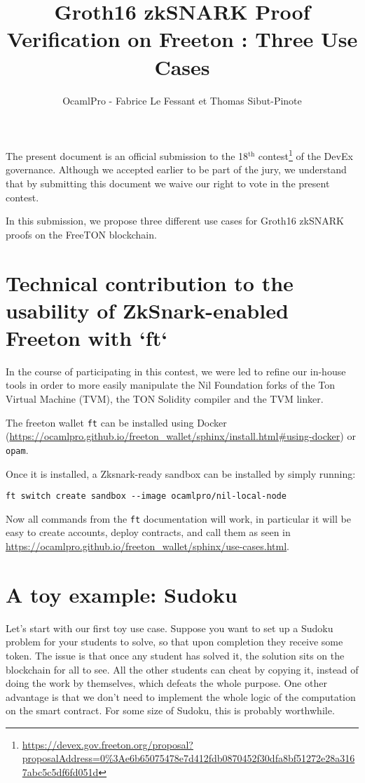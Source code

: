 \documentclass[10pt,a4paper]{article}
\author{OcamlPro - Fabrice Le Fessant et Thomas Sibut-Pinote}
\title{Groth16 zkSNARK Proof Verification on Freeton : Three Use Cases}
\begin{document}
\maketitle

The present document is an official submission to the 18$^{\text{th}}$ contest\footnote{\url{https://devex.gov.freeton.org/proposal?proposalAddress=0\%3Ae6b65075478e7d412fdb0870452f30dfa8bf51272e28a3167abc5c5df6fd051d}} of the DevEx governance. Although we accepted earlier to be part of the jury, we understand that by submitting this document we waive our right to vote in the present contest.

In this submission, we propose three different use cases for Groth16
zkSNARK proofs on the FreeTON blockchain.

\section{Technical contribution to the usability of ZkSnark-enabled Freeton with `ft`}

In the course of participating in this contest, we were led to refine our in-house tools in order to more easily manipulate the Nil Foundation forks of the Ton Virtual Machine (TVM), the TON Solidity compiler and the TVM linker.

The freeton wallet \lstinline|ft| can be installed using Docker (\url{https://ocamlpro.github.io/freeton_wallet/sphinx/install.html#using-docker}) or \lstinline|opam|.

Once it is installed, a Zksnark-ready sandbox can be installed by simply running:

\begin{lstlisting}[style=BashInputStyle]
ft switch create sandbox --image ocamlpro/nil-local-node
\end{lstlisting}

Now all commands from the \lstinline|ft| documentation will work, in particular it will be easy to create accounts, deploy contracts, and call them as seen in \url{https://ocamlpro.github.io/freeton_wallet/sphinx/use-cases.html}.

\section{A toy example: Sudoku}
\label{section_sudoku}

Let's start with our first toy use case. Suppose you want to set up a Sudoku problem for your students to solve, so that upon completion they receive some token. The issue is that once any student has solved it, the solution sits on the blockchain for all to see. All the other students can cheat by copying it, instead of doing the work by themselves, which defeats the whole purpose. One other advantage is that we don't need to implement the whole logic of the computation on the smart contract. For some size of Sudoku, this is probably worthwhile.
\end{document}
